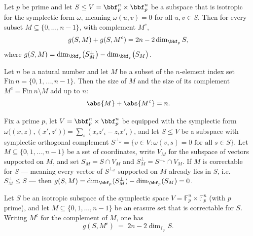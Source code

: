 \begin{lemma}
\label{cleaning_dimension_identity}
\leanok
{}
Let $p$ be prime and let $S \le V = \bbf_p^n \times \bbf_p^n$ be a subspace that is
isotropic for the symplectic form $\omega$, meaning $\omega(u,v)=0$ for all $u,v \in S$.
Then for every subset $M \subseteq \{0,\dots,n-1\}$, with complement $M^c$,
\[
g(S,M) + g(S,M^c) = 2n - 2\dim_{\bbf_p} S,
\]
where $g(S,M) = \dim_{\bbf_p}\!\big(S^{\perp}_M\big) - \dim_{\bbf_p}\!\big(S_M\big)$.
\end{lemma}

\begin{lemma}
\label{card_add_compl}
\leanok
{}
Let $n$ be a natural number and let $M$ be a subset of the $n$-element index set
$\mathrm{Fin}\,n = \{0, 1, \dots, n-1\}$. Then the size of $M$ and the size of its
complement $M^c = \mathrm{Fin}\,n \setminus M$ add up to $n$: \[ \abs{M} + \abs{M^c} =
n. \]
\end{lemma}

\begin{lemma}
\label{correctable_implies_g_zero}
\leanok
{}
Fix a prime $p$, let $V = \bbf_p^n \times \bbf_p^n$ be equipped with the symplectic form
$\omega\big((x,z),(x',z')\big) = \sum_{i} (x_i z'_i - z_i x'_i)$, and let $S \le V$ be a
subspace with symplectic orthogonal complement $S^{\perp_\omega} = \{v \in V :
\omega(v,s) = 0 \text{ for all } s \in S\}$. Let $M \subseteq \{0,1,\dots,n-1\}$ be a
set of coordinates, write $V_M$ for the subspace of vectors supported on $M$, and set
$S_M = S \cap V_M$ and $S^{\perp}_M = S^{\perp_\omega} \cap V_M$. If $M$ is correctable
for $S$ — meaning every vector of $S^{\perp_\omega}$ supported on $M$ already lies in
$S$, i.e. $S^{\perp}_M \le S$ — then $g(S,M) = \dim_{\bbf_p}(S^{\perp}_M) -
\dim_{\bbf_p}(S_M) = 0$.
\end{lemma}

\begin{lemma}
\label{g_complement_correctable}
\leanok
{}
Let $S$ be an isotropic subspace of the symplectic space $V = \mathbb{F}_p^n \times
\mathbb{F}_p^n$ (with $p$ prime), and let $M \subseteq \{0,1,\dots,n-1\}$ be an erasure
set that is correctable for $S$. Writing $M^c$ for the complement of $M$, one has
\[
g(S, M^c) \;=\; 2n - 2\dim_{\mathbb{F}_p} S.
\]
\end{lemma}

